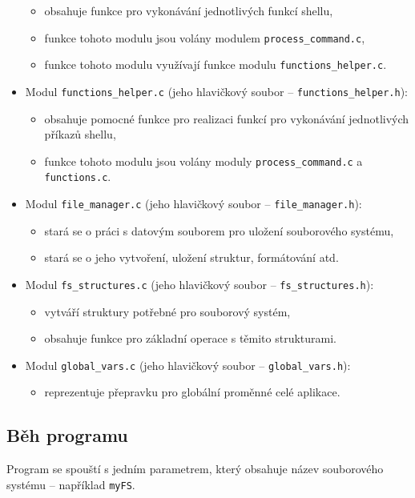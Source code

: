 \documentclass[
11pt,
a4paper,
pdftex,
czech,
titlepage
]{report}
\begin{document}
\begin{itemize}
	\begin{itemize}
	\item obsahuje funkce pro vykonávání jednotlivých funkcí shellu,
	\item funkce tohoto modulu jsou volány modulem \texttt{process\_command.c},
	\item funkce tohoto modulu využívají funkce modulu \texttt{functions\_helper.c}.
	\end{itemize}
\item Modul \texttt{functions\_helper.c} (jeho hlavičkový soubor -- \texttt{functions\_helper.h}):
	\begin{itemize}
	\item obsahuje pomocné funkce pro realizaci funkcí pro vykonávání jednotlivých příkazů shellu,
	\item funkce tohoto modulu jsou volány moduly \texttt{process\_command.c} a  \texttt{functions.c}.
	\end{itemize}
\item Modul \texttt{file\_manager.c} (jeho hlavičkový soubor -- \texttt{file\_manager.h}):
	\begin{itemize}
	\item stará se o práci s datovým souborem pro uložení souborového systému,
	\item stará se o jeho vytvoření, uložení struktur, formátování atd.
	\end{itemize}
\item Modul \texttt{fs\_structures.c} (jeho hlavičkový soubor -- \texttt{fs\_structures.h}):
	\begin{itemize}
	\item vytváří struktury potřebné pro souborový systém,
	\item obsahuje funkce pro základní operace s těmito strukturami.
	\end{itemize}
\item Modul \texttt{global\_vars.c} (jeho hlavičkový soubor -- \texttt{global\_vars.h}):
	\begin{itemize}
	\item reprezentuje přepravku pro globální proměnné celé aplikace.
	\end{itemize}
\end{itemize}

\subsection{Běh programu}
Program se spouští s jedním parametrem, který obsahuje název souborového systému -- například \texttt{myFS}. 
\end{document}
